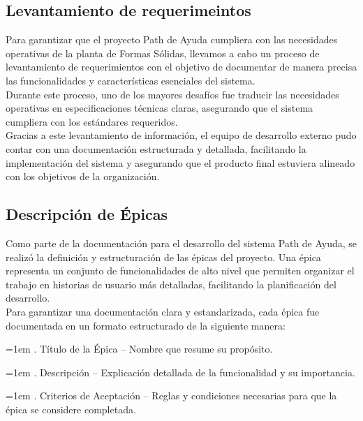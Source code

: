\documentclass[12pt,letterpaper,spanish, xcolor=table]{report}
\numberwithin{figure}{subsection}
\begin{document}
\subsection{Levantamiento de requerimeintos}

	Para garantizar que el proyecto Path de Ayuda cumpliera con las necesidades operativas de la planta de Formas Sólidas, llevamos a cabo un proceso de levantamiento de requerimientos con el objetivo de documentar de manera precisa las funcionalidades y características esenciales del sistema.\\
	
	Durante este proceso, uno de los mayores desafíos fue traducir las necesidades operativas en especificaciones técnicas claras, asegurando que el sistema cumpliera con los estándares requeridos.\\
	
	Gracias a este levantamiento de información, el equipo de desarrollo externo pudo contar con una documentación estructurada y detallada, facilitando la implementación del sistema y asegurando que el producto final estuviera alineado con los objetivos de la organización.

\subsection{Descripción de Épicas}

	Como parte de la documentación para el desarrollo del sistema Path de Ayuda, se realizó la definición y estructuración de las épicas del proyecto. Una épica representa un conjunto de funcionalidades de alto nivel que permiten organizar el trabajo en historias de usuario más detalladas, facilitando la planificación del desarrollo.\\
	
	Para garantizar una documentación clara y estandarizada, cada épica fue documentada en un formato estructurado de la siguiente manera:\\
		
	{\leftskip=1em 
		. Título de la Épica – Nombre que resume su propósito.
	\par}
	
	{\leftskip=1em 
		. Descripción – Explicación detallada de la funcionalidad y su importancia.
	\par}
	
	{\leftskip=1em 
		. Criterios de Aceptación – Reglas y condiciones necesarias para que la épica se considere completada.\\
	\par}
\end{document}
